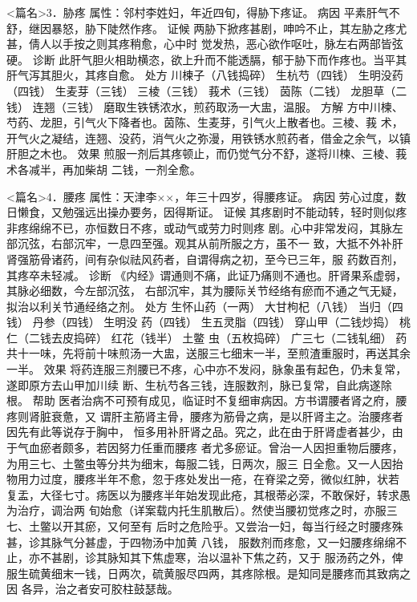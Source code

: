 \documentclass[a4paper,12pt,UTF8,twoside]{ctexbook}
\begin{document}
<篇名>3．胁疼
属性：邻村李姓妇，年近四旬，得胁下疼证。 
病因 平素肝气不舒，继因暴怒，胁下陡然作疼。 
证候 两胁下掀疼甚剧，呻吟不止，其左胁之疼尤甚，倩人以手按之则其疼稍愈，心中时 
觉发热，恶心欲作呕吐，脉左右两部皆弦硬。 
诊断 此肝气胆火相助横恣，欲上升而不能透膈，郁于胁下而作疼也。当平其肝气泻其胆火，其疼自愈。 
处方 川楝子（八钱捣碎） 生杭芍（四钱） 生明没药（四钱） 生麦芽（三钱） 
三棱（三钱） 莪术（三钱） 茵陈（二钱） 龙胆草（二钱） 连翘（三钱） 
磨取生铁锈浓水，煎药取汤一大盅，温服。 
方解 方中川楝、芍药、龙胆，引气火下降者也。茵陈、生麦芽，引气火上散者也。三棱、莪 
术，开气火之凝结，连翘、没药，消气火之弥漫，用铁锈水煎药者，借金之余气，以镇 
肝胆之木也。 
效果 煎服一剂后其疼顿止，而仍觉气分不舒，遂将川楝、三棱、莪术各减半，再加柴胡 
二钱，一剂全愈。 


<篇名>4．腰疼
属性：天津李××，年三十四岁，得腰疼证。 
病因 劳心过度，数日懒食，又勉强远出操办要务，因得斯证。 
证候 其疼剧时不能动转，轻时则似疼非疼绵绵不已，亦恒数日不疼，或动气或劳力时则疼 
剧。心中非常发闷，其脉左部沉弦，右部沉牢，一息四至强。观其从前所服之方，虽不一 
致，大抵不外补肝肾强筋骨诸药，间有杂似祛风药者，自谓得病之初，至今已三年，服 
药数百剂，其疼卒未轻减。 
诊断 《内经》谓通则不痛，此证乃痛则不通也。肝肾果系虚弱，其脉必细数，今左部沉弦， 
右部沉牢，其为腰际关节经络有瘀而不通之气无疑，拟治以利关节通经络之剂。 
处方 生怀山药（一两） 大甘枸杞（八钱） 当归（四钱） 丹参（四钱） 生明没 
药（四钱） 生五灵脂（四钱） 穿山甲（二钱炒捣） 桃仁（二钱去皮捣碎） 红花（钱半） 土鳖 
虫（五枚捣碎） 广三七（二钱轧细） 
药共十一味，先将前十味煎汤一大盅，送服三七细末一半，至煎渣重服时，再送其余一半。 
效果 将药连服三剂腰已不疼，心中亦不发闷，脉象虽有起色，仍未复常，遂即原方去山甲加川续 
断、生杭芍各三钱，连服数剂，脉已复常，自此病遂除根。 
帮助 医者治病不可预有成见，临证时不复细审病因。方书谓腰者肾之府，腰疼则肾脏衰惫，又 
谓肝主筋肾主骨，腰疼为筋骨之病，是以肝肾主之。治腰疼者因先有此等说存于胸中， 
恒多用补肝肾之品。究之，此在由于肝肾虚者甚少，由于气血瘀者颇多，若因努力任重而腰疼 
者尤多瘀证。曾治一人因担重物后腰疼，为用三七、土鳖虫等分共为细末，每服二钱，日两次，服三 
日全愈。又一人因抬物用力过度，腰疼半年不愈，忽于疼处发出一疮，在脊梁之旁，微似红肿，状若 
复盂，大径七寸。疡医以为腰疼半年始发现此疮，其根蒂必深，不敢保好，转求愚为治疗，调治两 
旬始愈（详案载内托生肌散后）。然使当腰初觉疼之时，亦服三七、土鳖以开其瘀，又何至有 
后时之危险乎。又尝治一妇，每当行经之时腰疼殊甚，诊其脉气分甚虚，于四物汤中加黄 八钱， 
服数剂而疼愈，又一妇腰疼绵绵不止，亦不甚剧，诊其脉知其下焦虚寒，治以温补下焦之药，又于 
服汤药之外，俾服生硫黄细末一钱，日两次，硫黄服尽四两，其疼除根。是知同是腰疼而其致病之因 
各异，治之者安可胶柱鼓瑟哉。 
\end{document}
